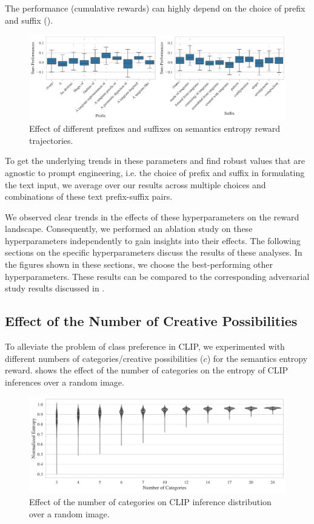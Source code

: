 The performance (cumulative rewards) can highly depend on the choice of prefix and suffix ().
\begin{figure}[h]
    \centering
    \includegraphics[width=\textwidth]{images/prefix-suffix.pdf}
    \caption{Effect of different prefixes and suffixes on semantics entropy reward trajectories.}
    \label{fig:prefix-suffix}
\end{figure}

To get the underlying trends in these parameters and find robust values that are agnostic to prompt engineering, i.e. the choice of prefix and suffix in formulating the text input, we average over our results across multiple choices and combinations of these text prefix-suffix pairs.

We observed clear trends in the effects of these hyperparameters on the reward landscape.
Consequently, we performed an ablation study on these hyperparameters independently to gain insights into their effects.
The following sections on the specific hyperparameters discuss the results of these analyses.
In the figures shown in these sections, we choose the best-performing other hyperparameters.
These results can be compared to the corresponding adversarial study results discussed in .

\subsection{Effect of the Number of Creative Possibilities}
\label{sec:clip-categories}
To alleviate the problem of class preference in CLIP, we experimented with different numbers of categories/creative possibilities (\(c\)) for the semantics entropy reward.
 shows the effect of the number of categories on the entropy of CLIP inferences over a random image.

\begin{figure}[H]
    \centering
    \includegraphics[width=\textwidth]{images/category_comparison_tangram.pdf}
    \caption{Effect of the number of categories on CLIP inference distribution over a random image.}
    \label{fig:clip-categories}
\end{figure}

